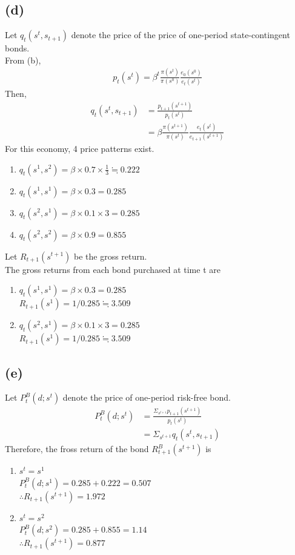 \documentclass{ltjsarticle}
\begin{document}
\subsection*{(d)}
Let $q_t(s^t, s_{t+1})$ denote the price of the price of one-period state-contingent bonds.\\
From (b),
\begin{align*}
    p_t(s^t) = \beta^t \frac{\pi(s^t)}{\pi(s^0)} \frac{e_0(s^0)}{e_t(s^t)}
\end{align*}
Then,
\begin{align*}
    q_t(s^t, s_{t+1}) &= \frac{p_{t+1}(s^{t+1})}{p_t(s^t)}\\
    &= \beta \frac{\pi(s^{t+1})}{\pi(s^t)} \frac{e_t(s^t)}{e_{t+1}(s^{t+1})}
\end{align*}
For this economy, 4 price patterns exist.
\begin{enumerate}[label=(\roman*)]
    \item $q_t(s^1, s^2) = \beta \times 0.7 \times \frac{1}{3} \fallingdotseq 0.222$
    \item $q_t(s^1, s^1) = \beta \times 0.3 = 0.285$
    \item $q_t(s^2, s^1) = \beta \times 0.1 \times 3 = 0.285$
    \item $q_t(s^2, s^2) = \beta \times 0.9 = 0.855$
\end{enumerate}
Let $R_{t+1}(s^{t+1})$ be the gross return.\\
The gross returns from each bond purchased at time t are
\begin{enumerate}[label=(\roman*)]
    \item $q_t(s^1, s^1) = \beta \times 0.3 = 0.285$\\
    $R_{t+1}(s^1) = 1/0.285 \fallingdotseq 3.509$
    \item $q_t(s^2, s^1) = \beta \times 0.1 \times 3 = 0.285$\\
    $R_{t+1}(s^1) = 1/0.285 \fallingdotseq 3.509$
\end{enumerate}

\subsection*{(e)}
Let $P_t^B(d; s^t)$ denote the price of one-period risk-free bond.
\begin{align*}
    P_t^B(d; s^t) &= \frac{\Sigma_{s^{t+1}} p_{t+1}(s^{t+1})}{p_t(s^t)}\\
    &= \Sigma_{s^{t+1}} q_t(s^t, s_{t+1})
\end{align*}
Therefore, the fross return of the bond $R_{t+1}^B (s^{t+1})$ is
\begin{enumerate}[label=(\roman*)]
    \item $s^t = s^1$\\
    $P_t^B(d; s^1) = 0.285 + 0.222 = 0.507$\\
    $\therefore R_{t+1}(s^{t+1}) = 1.972$
    \item $s^t = s^2$\\
    $P_t^B(d; s^2) = 0.285 + 0.855 = 1.14$\\
    $\therefore R_{t+1}(s^{t+1}) = 0.877$
\end{enumerate}
\end{document}
